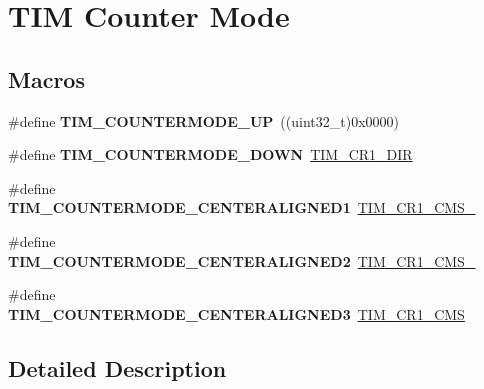 \hypertarget{group___t_i_m___counter___mode}{\section{T\-I\-M Counter Mode}
\label{group___t_i_m___counter___mode}
}
\subsection*{Macros}
\begin{DoxyCompactItemize}
\item 
\hypertarget{group___t_i_m___counter___mode_ga9eb9ab91119c2c76d4db453d599c0b7d}{\#define {\bfseries T\-I\-M\-\_\-\-C\-O\-U\-N\-T\-E\-R\-M\-O\-D\-E\-\_\-\-U\-P}~((uint32\-\_\-t)0x0000)}\label{group___t_i_m___counter___mode_ga9eb9ab91119c2c76d4db453d599c0b7d}

\item 
\hypertarget{group___t_i_m___counter___mode_ga5f590fdd7c41df7180b870bb76ff691c}{\#define {\bfseries T\-I\-M\-\_\-\-C\-O\-U\-N\-T\-E\-R\-M\-O\-D\-E\-\_\-\-D\-O\-W\-N}~\hyperlink{group___peripheral___registers___bits___definition_gacea10770904af189f3aaeb97b45722aa}{T\-I\-M\-\_\-\-C\-R1\-\_\-\-D\-I\-R}}\label{group___t_i_m___counter___mode_ga5f590fdd7c41df7180b870bb76ff691c}

\item 
\hypertarget{group___t_i_m___counter___mode_ga26d8e5236c35d85c2abaa482b5ec6746}{\#define {\bfseries T\-I\-M\-\_\-\-C\-O\-U\-N\-T\-E\-R\-M\-O\-D\-E\-\_\-\-C\-E\-N\-T\-E\-R\-A\-L\-I\-G\-N\-E\-D1}~\hyperlink{group___peripheral___registers___bits___definition_ga83ca6f7810aba73dc8c12f22092d97a2}{T\-I\-M\-\_\-\-C\-R1\-\_\-\-C\-M\-S\-\_}}\label{group___t_i_m___counter___mode_ga26d8e5236c35d85c2abaa482b5ec6746}

\item 
\hypertarget{group___t_i_m___counter___mode_gae4517c68086ffa61a694576cec8fe634}{\#define {\bfseries T\-I\-M\-\_\-\-C\-O\-U\-N\-T\-E\-R\-M\-O\-D\-E\-\_\-\-C\-E\-N\-T\-E\-R\-A\-L\-I\-G\-N\-E\-D2}~\hyperlink{group___peripheral___registers___bits___definition_gab3ee4adcde3c001d3b97d2eae1730ea9}{T\-I\-M\-\_\-\-C\-R1\-\_\-\-C\-M\-S\-\_}}\label{group___t_i_m___counter___mode_gae4517c68086ffa61a694576cec8fe634}

\item 
\hypertarget{group___t_i_m___counter___mode_gaf0c3edf6ea1ade3520ab4970e1fc6e92}{\#define {\bfseries T\-I\-M\-\_\-\-C\-O\-U\-N\-T\-E\-R\-M\-O\-D\-E\-\_\-\-C\-E\-N\-T\-E\-R\-A\-L\-I\-G\-N\-E\-D3}~\hyperlink{group___peripheral___registers___bits___definition_ga352b3c389bde13dd6049de0afdd874f1}{T\-I\-M\-\_\-\-C\-R1\-\_\-\-C\-M\-S}}\label{group___t_i_m___counter___mode_gaf0c3edf6ea1ade3520ab4970e1fc6e92}

\end{DoxyCompactItemize}


\subsection{Detailed Description}
